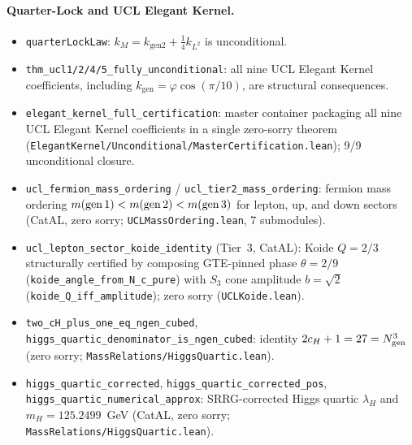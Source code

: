 \documentclass[11pt]{article}
\theoremstyle{remark}
\begin{document}
\begin{appendices}
\paragraph{Quarter-Lock and UCL Elegant Kernel.}
\begin{itemize}[leftmargin=1.2em,itemsep=0.1em,topsep=0.2em]
  \item \texttt{quarterLockLaw}: $k_M = k_{\mathrm{gen2}} + \tfrac{1}{4}k_{L^2}$ is unconditional.
  \item \texttt{thm\_ucl1/2/4/5\_fully\_unconditional}: all nine UCL Elegant Kernel coefficients, including $k_{\mathrm{gen}} = \varphi\cos(\pi/10)$, are structural consequences.
  \item \texttt{elegant\allowbreak\_kernel\allowbreak\_full\allowbreak\_certification}: master container packaging all nine UCL Elegant Kernel coefficients in a single zero-sorry theorem (\texttt{ElegantKernel/\allowbreak{}Unconditional/\allowbreak{}MasterCertification.lean}); 9/9 unconditional closure.
  \item \texttt{ucl\allowbreak\_fermion\allowbreak\_mass\allowbreak\_ordering} / \texttt{ucl\allowbreak\_tier2\allowbreak\_mass\allowbreak\_ordering}: fermion mass ordering $m(\text{gen\,1}) < m(\text{gen\,2}) < m(\text{gen\,3})$ for lepton, up, and down sectors (CatAL, zero sorry; \texttt{UCLMassOrdering.lean}, 7 submodules).
  \item \texttt{ucl\allowbreak\_lepton\allowbreak\_sector\allowbreak\_koide\allowbreak\_identity} (Tier~3, CatAL): Koide $Q=2/3$ structurally certified by composing GTE-pinned phase $\theta=2/9$ (\texttt{koide\allowbreak\_angle\allowbreak\_from\allowbreak\_N\allowbreak\_c\allowbreak\_pure}) with $S_3$ cone amplitude $b=\sqrt{2}$ (\texttt{koide\allowbreak\_Q\allowbreak\_iff\allowbreak\_amplitude}); zero sorry (\texttt{UCLKoide.lean}).
  \item \texttt{two\allowbreak\_cH\allowbreak\_plus\allowbreak\_one\allowbreak\_eq\allowbreak\_ngen\allowbreak\_cubed}, \texttt{higgs\allowbreak\_quartic\allowbreak\_denominator\allowbreak\_is\allowbreak\_ngen\allowbreak\_cubed}: identity $2c_H + 1 = 27 = N_{\rm gen}^3$ (zero sorry; \texttt{MassRelations/\allowbreak{}HiggsQuartic.lean}).
  \item \texttt{higgs\allowbreak\_quartic\allowbreak\_corrected}, \texttt{higgs\allowbreak\_quartic\allowbreak\_corrected\allowbreak\_pos}, \texttt{higgs\allowbreak\_quartic\allowbreak\_numerical\allowbreak\_approx}: SRRG-corrected Higgs quartic $\lambda_H$ and $m_H = 125.2499$~GeV (CatAL, zero sorry; \texttt{MassRelations/\allowbreak{}HiggsQuartic.lean}).
\end{itemize}


\end{appendices}
\end{document}
